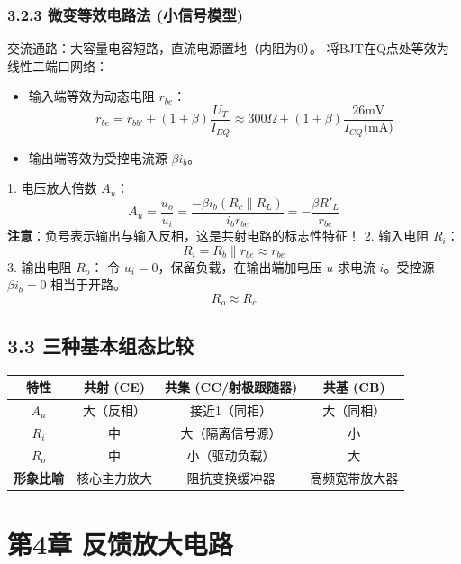 \documentclass[12pt,a4paper]{ctexart}
\begin{document}
	\subsubsection*{3.2.3 微变等效电路法 (小信号模型)}
	交流通路：大容量电容短路，直流电源置地（内阻为0）。
	将BJT在Q点处等效为线性二端口网络：
	\begin{itemize}
		\item 输入端等效为动态电阻 $r_{be}$：
		$$ r_{be} = r_{bb'} + (1+\beta)\frac{U_T}{I_{EQ}} \approx 300\Omega + (1+\beta)\frac{26\text{mV}}{I_{CQ}\text{(mA)}} $$
		\item 输出端等效为受控电流源 $\beta i_b$。
	\end{itemize}
	\begin{derivebox}[共射放大电路交流参数推导]
		1. 电压放大倍数 $A_u$：
		$$ A_u = \frac{u_o}{u_i} = \frac{-\beta i_b (R_c \parallel R_L)}{i_b r_{be}} = -\frac{\beta R'_L}{r_{be}} $$
		\textbf{注意}：负号表示输出与输入反相，这是共射电路的标志性特征！
		2. 输入电阻 $R_i$：
		$$ R_i = R_b \parallel r_{be} \approx r_{be} $$
		3. 输出电阻 $R_o$：
		令 $u_i=0$，保留负载，在输出端加电压 $u$ 求电流 $i$。受控源 $\beta i_b=0$ 相当于开路。
		$$ R_o \approx R_c $$
	\end{derivebox}
	\subsection*{3.3 三种基本组态比较}
	\begin{center}
		\renewcommand{\arraystretch}{1.8}
		\begin{tabular}{|c|c|c|c|}
			\hline
			\textbf{特性} & \textbf{共射 (CE)} & \textbf{共集 (CC/射极跟随器)} & \textbf{共基 (CB)} \\
			\hline
			$A_u$ & 大（反相） & 接近1（同相） & 大（同相） \\
			\hline
			$R_i$ & 中 & 大（隔离信号源） & 小 \\
			\hline
			$R_o$ & 中 & 小（驱动负载） & 大 \\
			\hline
			\textbf{形象比喻} & 核心主力放大 & 阻抗变换缓冲器 & 高频宽带放大器 \\
			\hline
		\end{tabular}
	\end{center}
	\clearpage
	\section*{第4章 反馈放大电路}
\end{document}
